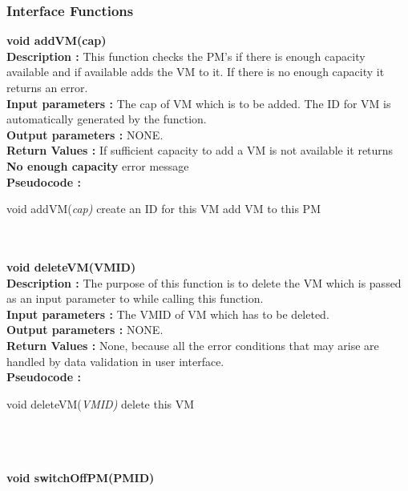 ﻿\documentclass[a4paper,11pt]{article}
\begin{document}
\subsubsection{Interface Functions}
\textbf{void addVM(cap)}
\\
\textbf{Description :} This function checks the PM's if there is enough capacity available and if available adds the VM to it. If there is no enough capacity 
it returns an error.
\\
\textbf{Input parameters :} The cap of VM which is to be added. The ID for VM is automatically generated by the function.
\\
\textbf{Output parameters :} NONE.
\\
\textbf{Return Values :} If sufficient capacity to add a VM is not available it returns \textbf{No enough capacity} error message
\\
\textbf{Pseudocode :}
\begin{algorithmic}[1]
\STATE void addVM(\emph{cap)}
\STATE create an ID for this VM
\STATE add VM to this PM
\ENDIF
\ENDFOR
\end{algorithmic}
\mbox{}\\\\
\textbf{void deleteVM(VM\textunderscore ID)}
\\
\textbf{Description :} The purpose of this function is to delete the VM which is passed as an input parameter to while calling this function.
\\
\textbf{Input parameters :} The VM\textunderscore ID of VM which has to be deleted.
\\
\textbf{Output parameters :} NONE.
\\
\textbf{Return Values :} None, because all the error conditions that may arise are handled by data validation in user interface.
\\
\textbf{Pseudocode :}
\begin{algorithmic}[1]
\STATE void deleteVM(\emph{VM\textunderscore ID)}
\STATE delete this VM
\ENDIF
\ENDFOR
\ENDFOR
\end{algorithmic}
\mbox{}\\\\
\pagebreak
\\
\textbf{ void switchOffPM(PM\textunderscore ID)}
\end{document}
